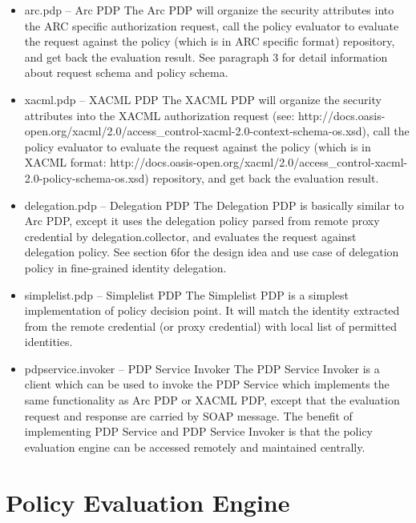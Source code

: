 \documentclass{article}                            %
\begin{document}
\begin{itemize}
    \item arc.pdp – Arc PDP
The Arc PDP will organize the security attributes into the ARC specific authorization request, call the policy evaluator to evaluate the request against the policy (which is in ARC specific format) repository, and get back the evaluation result. See paragraph 3 for detail information about request schema and policy schema.

    \item xacml.pdp – XACML PDP
The XACML PDP will organize the security attributes into the XACML authorization request (see: http://docs.oasis-open.org/xacml/2.0/access\_control-xacml-2.0-context-schema-os.xsd), call the policy evaluator to evaluate the request against the policy (which is in XACML format: http://docs.oasis-open.org/xacml/2.0/access\_control-xacml-2.0-policy-schema-os.xsd) repository, and get back the evaluation result. 

    \item delegation.pdp – Delegation PDP
The Delegation PDP is basically similar to Arc PDP, except it uses the delegation policy parsed from remote proxy credential by delegation.collector, and evaluates the request against delegation policy. See section 6for the design idea and use case of delegation policy in fine-grained identity delegation.

    \item simplelist.pdp – Simplelist PDP
The Simplelist PDP is a simplest implementation of policy decision point. It will match the identity extracted from the remote credential (or proxy credential) with local list of permitted identities.

    \item pdpservice.invoker – PDP Service Invoker
The PDP Service Invoker is a client which can be used to invoke the PDP Service which implements the same functionality as Arc PDP or XACML PDP, except that the evaluation request and response are carried by SOAP message. The benefit of implementing PDP Service and PDP Service Invoker is that the policy evaluation engine can be accessed remotely and maintained centrally.

\end{itemize}




\section{Policy Evaluation Engine} %
\label{sec:policy_eval}
\end{document}
